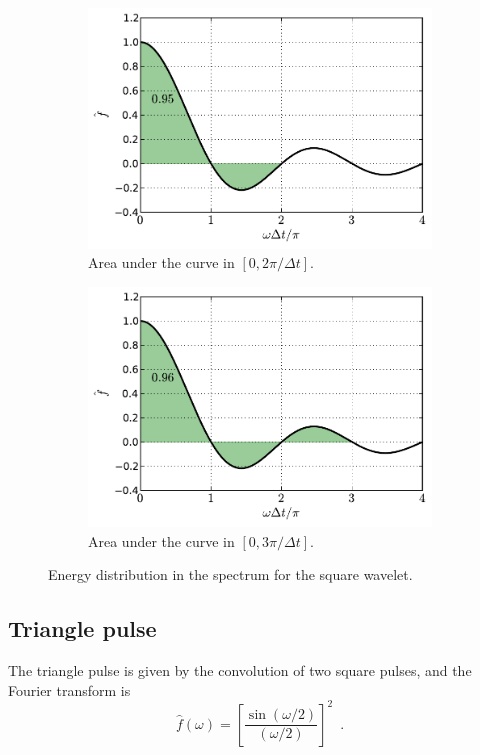 \documentclass[12pt,letterpaper]{article}
\begin{document}
{\begin{figure}[h]
\begin{subfigure}[b]{0.45\textwidth}
        \includegraphics[width=\textwidth]{img/square_area=3.pdf}
        \caption{Area under the curve in $[0,2\pi/\Delta t]$.}
    \end{subfigure}
    \begin{subfigure}[b]{0.45\textwidth}
        \includegraphics[width=\textwidth]{img/square_area=4.pdf}
        \caption{Area under the curve in $[0,3\pi/\Delta t]$.}
    \end{subfigure}
    \caption{Energy distribution in the spectrum for the square wavelet.}
    \label{fig:square-areas}
\end{figure}

\subsection{Triangle pulse}
The triangle pulse is given by the convolution of two square pulses, and the Fourier transform is
\begin{equation}
\hat{f}(\omega) = \left[\frac{\sin(\omega/2)}{(\omega/2)}\right]^2 \enspace .
\end{equation}

}
\end{document}
